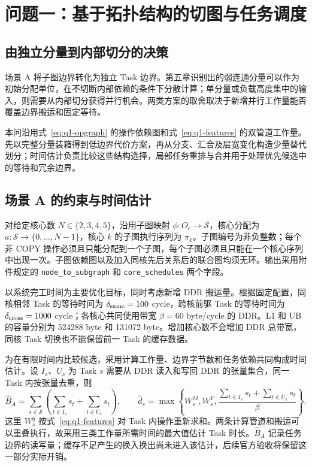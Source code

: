 \section{问题一：基于拓扑结构的切图与任务调度}

\subsection{由独立分量到内部切分的决策}
场景 A 将子图边界转化为独立 Task 边界。第五章识别出的弱连通分量可以作为初始分配单位，在不切断内部依赖的条件下分散计算；单分量或负载高度集中的输入，则需要从内部切分获得并行机会。两类方案的取舍取决于新增并行工作量能否覆盖边界搬运和固定等待。

本问沿用式~\eqref{eq:q1-opgraph} 的操作依赖图和式~\eqref{eq:q1-features} 的双管道工作量。先以完整分量装箱得到低边界代价方案，再从分支、汇合及层宽变化构造少量替代划分；时间估计负责比较这些结构选择，局部任务重排与合并用于处理优先候选中的等待和冗余边界。

\subsection{场景 A 的约束与时间估计}
对给定核心数 $N\in\{2,3,4,5\}$，沿用子图映射 $\phi:O_c\to\mathcal S$，核心分配为 $a:\mathcal S\to\{0,\ldots,N-1\}$，核心 $k$ 的子图执行序列为 $\pi_k$。子图编号为非负整数；每个非 COPY 操作必须且只能分配到一个子图，每个子图必须且只能在一个核心序列中出现一次。子图依赖图以及加入同核先后关系后的联合图均须无环。输出采用附件规定的 \texttt{node\_to\_subgraph} 和 \texttt{core\_schedules} 两个字段。

以系统完工时间为主要优化目标，同时考虑新增 DDR 搬运量。根据固定配置，同核相邻 Task 的等待时间为 $\delta_{\rm same}=100$ cycle，跨核前驱 Task 的等待时间为 $\delta_{\rm cross}=1000$ cycle；各核心共同使用带宽 $\beta=60$ byte/cycle 的 DDR。L1 和 UB 的容量分别为 524288 byte 和 131072 byte。增加核心数不会增加 DDR 总带宽，同核 Task 切换也不能保留前一 Task 的缓存数据。

为在有限时间内比较候选，采用计算工作量、边界字节数和任务依赖共同构成时间估计。设 $I_s$、$U_s$ 为 Task $s$ 需要从 DDR 读入和写回 DDR 的张量集合，同一 Task 内按张量去重，则
\begin{equation}
\widehat B_A=\sum_{s\in\mathcal S}\left(\sum_{t\in I_s}s_t+\sum_{t\in U_s}s_t\right),\qquad
\widehat d_s=\max\left\{W_s^M,W_s^V,
\frac{\sum_{t\in I_s}s_t+\sum_{t\in U_s}s_t}{\beta}\right\}.
\label{eq:q1-duration}
\end{equation}
这里 $W_s^q$ 按式~\eqref{eq:q1-features} 对 Task 内操作重新求和。两条计算管道和搬运可以重叠执行，故采用三类工作量所需时间的最大值估计 Task 时长。$\widehat B_A$ 记录任务边界的读写量；缓存不足产生的换入换出尚未进入该估计，后续官方验收将保留这一部分实际开销。

